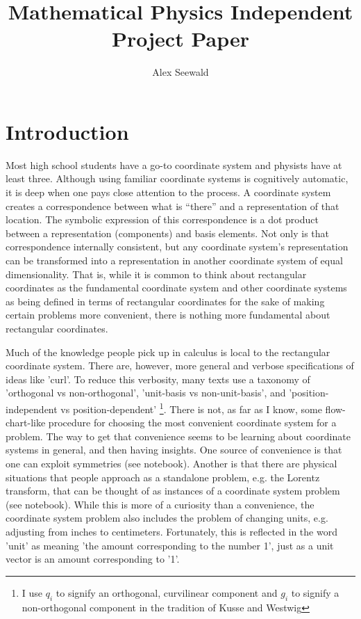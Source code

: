 \documentclass{article}
\author{Alex Seewald}
\title{Mathematical Physics Independent Project Paper}
\begin{document}
\newcommand{\unit}[1]{ \hat{\mathbf{e}_{#1}} }
\newcommand{\skewunit}[1]{ \hat{\mathbf{g}_{#1}} }
\newcommand{\partialfrac}[2]{\frac{\partial{#1}}{\partial{#2}}}
\newcommand{\norm}[1]{\lvert #1 \rvert}

\nocite{*}


\maketitle

\tableofcontents

\section*{Introduction}

Most high school students have a go-to coordinate system and physists have at least three. Although using familiar coordinate systems is cognitively automatic, it is deep when one pays close attention to the process. A coordinate system creates a correspondence between what is “there” and a representation of that location. The symbolic expression of this correspondence is a dot product between a representation (components) and basis elements. Not only is that correspondence internally consistent, but any coordinate system’s representation can be transformed into a representation in another coordinate system of equal dimensionality. That is, while it is common to think about rectangular coordinates as the fundamental coordinate system and other coordinate systems as being defined in terms of rectangular coordinates for the sake of making certain problems more convenient, there is nothing more fundamental about rectangular coordinates.

Much of the knowledge people pick up in calculus is local to the rectangular coordinate system. There are, however, more general and verbose specifications of ideas like 'curl'. To reduce this verbosity, many texts use a taxonomy of 'orthogonal vs non-orthogonal', 'unit-basis vs non-unit-basis', and 'position-independent vs position-dependent' \footnote{I use $q_i$ to signify an orthogonal, curvilinear component and $g_i$ to signify a non-orthogonal component in the tradition of Kusse and Westwig}. There is not, as far as I know, some flow-chart-like procedure for choosing the most convenient coordinate system for a problem. The way to get that convenience seems to be learning about coordinate systems in general, and then having insights. One source of convenience is that one can exploit symmetries (see notebook). Another is that there are physical situations that people approach as a standalone problem, e.g. the Lorentz transform, that can be thought of as instances of a coordinate system problem (see notebook). While this is more of a curiosity than a convenience, the coordinate system problem also includes the problem of changing units, e.g. adjusting from inches to centimeters. Fortunately, this is reflected in the word 'unit' as meaning 'the amount corresponding to the number 1', just as a unit vector is an amount corresponding to '1'.
\end{document}
